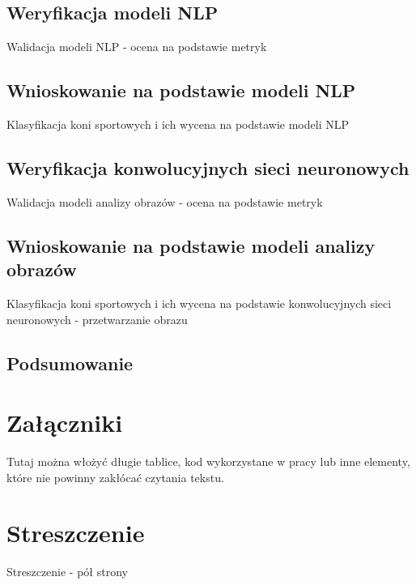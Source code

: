 \documentclass[polish, twoside, 12pt, a4paper]{article}
\theoremstyle{definition}
\theoremstyle{plain}
\theoremstyle{remark}
\begin{document}
\subsection{Weryfikacja modeli NLP}

Walidacja modeli NLP - ocena na podstawie metryk

\subsection{Wnioskowanie na podstawie modeli NLP}

Klasyfikacja koni sportowych i ich wycena na podstawie modeli NLP

\subsection{Weryfikacja konwolucyjnych sieci neuronowych}

Walidacja modeli analizy obrazów - ocena na podstawie metryk

\subsection{Wnioskowanie na podstawie modeli analizy obrazów}

Klasyfikacja koni sportowych i ich wycena na podstawie konwolucyjnych sieci neuronowych - przetwarzanie obrazu

\subsection{Podsumowanie}


\appendix

\clearpage
\section{Załączniki}

Tutaj można włożyć długie tablice, kod wykorzystane w pracy lub inne elementy, które nie powinny zakłócać czytania tekstu.

\clearpage



\clearpage
{}
\listoftables

\clearpage
{}
\listoffigures



\clearpage
{}
\section*{Streszczenie}

Streszczenie - pół strony
\end{document}
